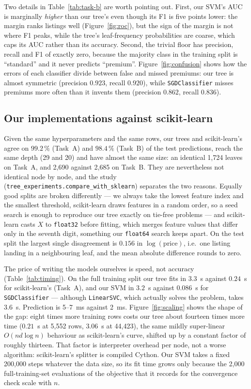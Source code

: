 \documentclass[10pt,twocolumn,a4paper]{article}
\begin{document}
Two details in Table~\ref{tab:task-b} are worth pointing out. First, our SVM's
AUC is marginally \emph{higher} than our tree's even though its F1 is five
points lower: the margin ranks listings well (Figure~\ref{fig:roc}), but the
sign of the margin is not where F1 peaks, while the tree's leaf-frequency
probabilities are coarse, which caps its AUC rather than its accuracy. Second,
the trivial floor has precision, recall and F1 of exactly zero, because the
majority class in the training split is ``standard'' and it never predicts
``premium''. Figure~\ref{fig:confusion} shows how the errors of each
classifier divide between false and missed premiums: our tree is almost
symmetric (precision $0.923$, recall $0.920$), while \texttt{SGDClassifier}
misses premiums more often than it invents them (precision $0.862$, recall
$0.836$).

\subsection{Our implementations against scikit-learn}
Given the same hyperparameters and the same rows, our trees and
scikit-learn's agree on $99.2\,\%$ (Task~A) and $98.4\,\%$ (Task~B) of the
test predictions, reach the same depth (29 and 20) and have almost the same
size: an identical 1{,}724 leaves on Task~A, and 2{,}690 against 2{,}685 on
Task~B. They are nevertheless not identical node by node, and the study
(\texttt{tree\_experiments.compare\_with\_sklearn}) separates the two reasons.
Equally good splits are broken differently --- we always take the lowest
feature index and the smallest threshold, scikit-learn draws features in a
random order, so a seed search is enough to reproduce our tree exactly on
tie-free problems --- and scikit-learn casts $X$ to \texttt{float32} before
fitting, which merges feature values that differ only in the seventh digit,
something our \texttt{float64} search keeps apart. On the test split the
largest single disagreement is $0.156$ in $\log(\text{price})$, i.e.\ one
listing landing in a neighbouring leaf, and the mean absolute difference
rounds to zero.

The price of writing the models ourselves is speed, not accuracy
(Table~\ref{tab:timing}). On the full training split our tree fits in
$3.3$~s against $0.24$~s for scikit-learn's (Task~A), and our SVM in
$3.2$~s against $0.086$~s for \texttt{SGDClassifier} --- although
\texttt{LinearSVC}, which actually solves the problem, takes $3.6$~s.
Prediction is 5--7~ms against 2~ms. Figure~\ref{fig:scaling} shows the shape
of the gap: eight times more training rows costs our tree about fourteen times
more time ($0.21$~s at 5{,}552 rows, $3.06$~s at 44{,}423), the same mildly
super-linear $O(nd\log n)$ behaviour as scikit-learn's curve, shifted up by a
constant factor of roughly thirteen. That factor is interpreter overhead per
node, not a worse algorithm: scikit-learn's splitter is compiled Cython. Our
SVM takes a fixed 200{,}000 steps whatever the data size, so its fit time
grows only because the 2{,}000 full-training-set evaluations of the objective
that it records for the convergence check scale with $n$.
\end{document}
